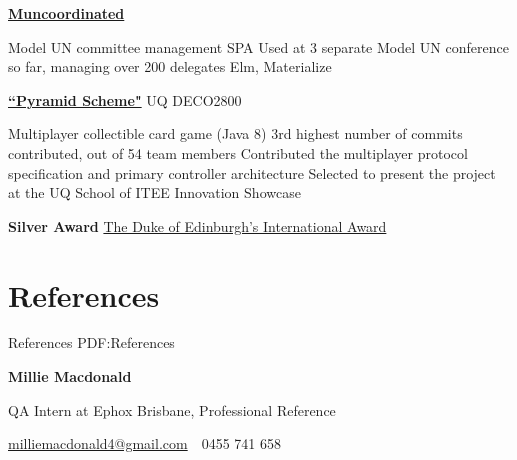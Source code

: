 \documentclass[a4paper,10pt,oneside]{article}
\begin{document}
\begin{body}
\href{https://github.com/MaxwellBo/Muncoordinated}{\textbf{Muncoordinated}}\hfill {}
\begin{detail}
	\BulletItem Model UN committee management SPA
	\BulletItem Used at 3 separate Model UN conference so far, managing over 200 delegates
	\BulletItem Elm, Materialize
\end{detail}
\EntryGap


\href{https://github.com/UQdeco2800/pyramidscheme2}{\textbf{``Pyramid Scheme"}} UQ DECO2800 \hfill {}
\begin{detail}
	\BulletItem Multiplayer collectible card game (Java 8)
	\BulletItem 3rd highest number of commits contributed, out of 54 team members
	\BulletItem Contributed the multiplayer protocol specification and primary controller architecture
	\BulletItem Selected to present the project at the UQ School of ITEE Innovation Showcase
\end{detail}
\EntryGap



\textbf{Silver Award}
\href{http://www.dukeofed.com.au/}{The Duke of Edinburgh’s International Award}
\hfill {}


\section
{References}
{References}
{PDF:References}

\textbf{Millie Macdonald}
\par QA Intern at Ephox Brisbane, Professional Reference
\begin{detail}
\href{mailto:milliemacdonald4@gmail.com}
{milliemacdonald4@gmail.com}
\,\BulletSymbol\,
0455 741 658
\end{detail}


\end{body}
\end{document}
